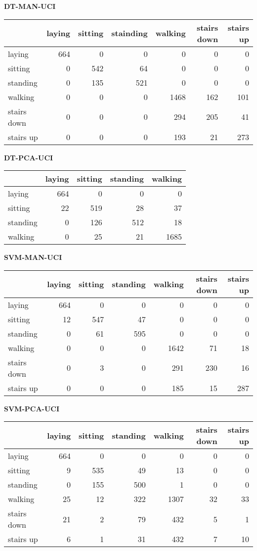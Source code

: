 {\bf DT-MAN-UCI}
\begin{center}
\begin{tabular}{|l|rrrrrr|} \hline
 & laying & sitting & stainding & walking & stairs down & stairs up\\
\hline
laying & 664 & 0 & 0 & 0 & 0 & 0\\
sitting & 0 & 542 & 64 & 0 & 0 & 0\\
standing & 0 & 135 & 521 & 0 & 0 & 0\\
walking & 0 & 0 & 0 & 1468 & 162 & 101\\
stairs down & 0 & 0 & 0 & 294 & 205 & 41\\
stairs up & 0 & 0 & 0 & 193 & 21 & 273\\
\hline
\end{tabular}
\end{center}

{\bf DT-PCA-UCI}
\begin{center}
\begin{tabular}{|l|rrrr|} \hline
 & laying & sitting & standing & walking\\
\hline
laying & 664 & 0 & 0 & 0\\
sitting & 22 & 519 & 28 & 37\\
standing & 0 & 126 & 512 & 18\\
walking & 0 & 25 & 21 & 1685\\
\hline
\end{tabular}
\end{center}

{\bf SVM-MAN-UCI}
\begin{center}
\begin{tabular}{|l|rrrrrr|} \hline
 & laying & sitting & standing & walking & stairs down & stairs up\\
\hline
laying & 664 & 0 & 0 & 0 & 0 & 0\\
sitting & 12 & 547 & 47 & 0 & 0 & 0\\
standing & 0 & 61 & 595 & 0 & 0 & 0\\
walking & 0 & 0 & 0 & 1642 & 71 & 18\\
stairs down & 0 & 3 & 0 & 291 & 230 & 16\\
stairs up & 0 & 0 & 0 & 185 & 15 & 287\\
\hline
\end{tabular}
\end{center}

{\bf SVM-PCA-UCI}
\begin{center}
\begin{tabular}{|l|rrrrrr|} \hline
 & laying & sitting & standing & walking & stairs down & stairs up\\
\hline
laying & 664 & 0 & 0 & 0 & 0 & 0\\
sitting & 9 & 535 & 49 & 13 & 0 & 0\\
standing & 0 & 155 & 500 & 1 & 0 & 0\\
walking & 25 & 12 & 322 & 1307 & 32 & 33\\
stairs down & 21 & 2 & 79 & 432 & 5 & 1\\
stairs up & 6 & 1 & 31 & 432 & 7 & 10\\
\hline
\end{tabular}
\end{center}



